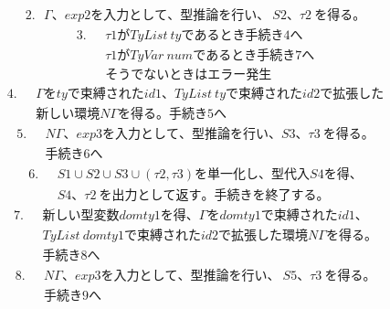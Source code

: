 \documentclass{jreport}
\begin{document}
\begin{equation}
  \begin{split}
    2. \ \ \ \Gamma、exp2 を入力として、型推論を行い、\ S2、\tau2 \ を得る。
  \end{split}
\end{equation}
\begin{equation}
  \begin{split}
    3. \ \ \ &\tau1 が TyList \ ty であるとき手続き4へ \\ &
    \tau1 が TyVar \ num であるとき手続き7へ \\ &
    そうでないときはエラー発生
  \end{split}
\end{equation}
\begin{equation}
  \begin{split}
    4. \ \ \ &\Gamma をtyで束縛されたid1、TyList \ tyで束縛されたid2で拡張した \\ &
    新しい環境 N\Gamma を得る。手続き5へ
  \end{split}
\end{equation}
\begin{equation}
  \begin{split}
    5. \ \ \ &N\Gamma、exp3 を入力として、型推論を行い、S3、\tau3 \ を得る。\\ &
    手続き6へ
  \end{split}
\end{equation}
\begin{equation}
  \begin{split}
    6. \ \ \ &S1 \cup S2 \cup S3 \cup (\tau2, \tau3) を単一化し、型代入S4を得、\\ &
    S4、\tau2 \ を出力として返す。手続きを終了する。
  \end{split}
\end{equation}
\begin{equation}
  \begin{split}
    7. \ \ \ &新しい型変数 domty1 を得、\Gamma を domty1 で束縛されたid1、\\ &
    TyList \ domty1 で束縛されたid2で拡張した環境 N\Gamma を得る。\\ &
    手続き8へ
  \end{split}
\end{equation}
\begin{equation}
  \begin{split}
    8. \ \ \ &N\Gamma、exp3 を入力として、型推論を行い、\ S5、\tau3 \ を得る。\\ &
    手続き9へ
  \end{split}
\end{equation}
\end{document}
